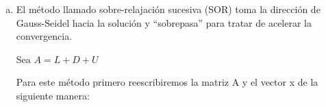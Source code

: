 \begin{frame}
	\begin{solution}
		\begin{enumerate}[b)]
			\item

			      El método llamado sobre-relajación sucesiva (SOR) toma
			      la dirección de Gauss-Seidel hacia la solución y
			      ``sobrepasa'' para tratar de acelerar la convergencia.

			      Sea
			      \begin{math}
				      A=L+D+U
			      \end{math}
                  
                  
                  Para este método primero reescribiremos la matriz A y el vector x de la siguiente manera:


\end{enumerate}
\end{solution}
\end{frame}
